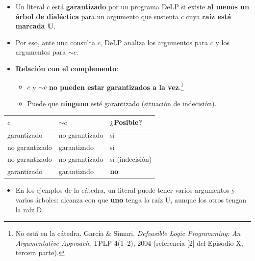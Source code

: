 \documentclass[11pt,a4paper]{article}
\newcommand{\fuentesweb}[1]{\footnote{\raggedright #1.}}
\begin{document}
\begin{itemize}
  \item Un literal $c$ está \textbf{garantizado} por un programa DeLP si existe \textbf{al menos un árbol de dialéctica} para un argumento que sustenta $c$ cuya \textbf{raíz está marcada U}.
  \item Por eso, ante una consulta $c$, DeLP analiza los argumentos para $c$ y los argumentos para ${\sim}c$.
  \item \textbf{Relación con el complemento}:
  \begin{itemize}
    \item $c$ y ${\sim}c$ \textbf{no pueden estar garantizados a la vez}.\fuentesweb{No está en la cátedra. García \& Simari, \textit{Defeasible Logic Programming: An Argumentative Approach}, TPLP 4(1--2), 2004 (referencia [2] del Episodio X, tercera parte)}
    \item Puede que \textbf{ninguno} esté garantizado (situación de indecisión).
  \end{itemize}
\end{itemize}

\begin{center}
\small
\begin{tabular}{@{}l l l@{}}
\toprule
\textbf{$c$} & \textbf{${\sim}c$} & \textbf{¿Posible?} \\
\midrule
garantizado & no garantizado & sí \\
no garantizado & garantizado & sí \\
no garantizado & no garantizado & sí (indecisión) \\
garantizado & garantizado & \textbf{no} \\
\bottomrule
\end{tabular}
\end{center}

\begin{extras}
\begin{itemize}
  \item En los ejemplos de la cátedra, un literal puede tener varios argumentos y varios árboles: alcanza con que \textbf{uno} tenga la raíz U, aunque los otros tengan la raíz D.
\end{itemize}
\end{extras}

\end{document}
